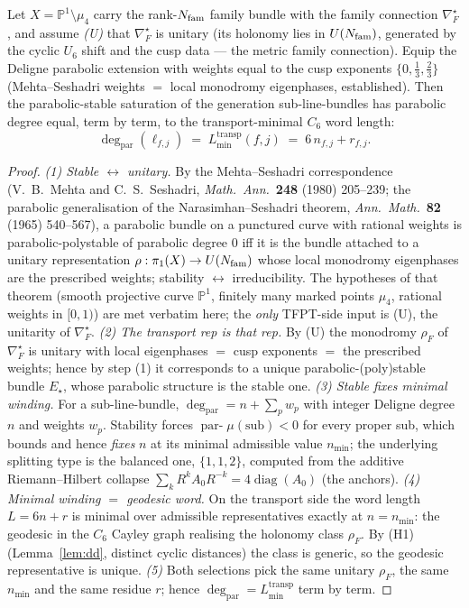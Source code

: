 \begin{theorem}[Stable $=$ minimal, via Mehta--Seshadri --- closes the flavor block]
\label{thm:ms}
Let $X=\mathbb P^1\setminus\mu_4$ carry the rank-$N_{\mathrm{fam}}$ family bundle with the family
connection $\nabla_F^\star$, and assume \emph{(U)} that $\nabla_F^\star$ is unitary (its holonomy lies in
$U(N_{\mathrm{fam}})$, generated by the cyclic $U_6$ shift and the cusp data --- the metric family connection).
Equip the Deligne parabolic extension with weights equal to the cusp exponents
$\{0,\tfrac13,\tfrac23\}$ (Mehta--Seshadri weights $=$ local monodromy eigenphases, established).
Then the parabolic-stable saturation of the generation sub-line-bundles has parabolic degree equal,
term by term, to the transport-minimal $C_6$ word length:
\[
  \deg_{\mathrm{par}}(\ell_{f,j}) \;=\; L^{\mathrm{transp}}_{\min}(f,j)\;=\;6\,n_{f,j}+r_{f,j}.
\]
\end{theorem}
\begin{proof}
\emph{(1) Stable $\leftrightarrow$ unitary.} By the Mehta--Seshadri correspondence (V.~B.~Mehta and
C.~S.~Seshadri, \emph{Math.\ Ann.}\ \textbf{248} (1980) 205--239; the parabolic generalisation of the
Narasimhan--Seshadri theorem, \emph{Ann.\ Math.}\ \textbf{82} (1965) 540--567), a parabolic bundle on
a punctured curve with rational weights is parabolic-polystable of parabolic degree $0$ iff it is the
bundle attached to a unitary representation $\rho:\pi_1(X)\to U(N_{\mathrm{fam}})$ whose local monodromy eigenphases
are the prescribed weights; stability $\leftrightarrow$ irreducibility. The hypotheses of that theorem
(smooth projective curve $\mathbb P^1$, finitely many marked points $\mu_4$, rational weights in $[0,1)$)
are met verbatim here; the \emph{only} TFPT-side input is (U), the unitarity of $\nabla_F^\star$.
\emph{(2) The transport rep is that rep.} By (U) the monodromy $\rho_F$ of $\nabla_F^\star$ is unitary
with local eigenphases $=$ cusp exponents $=$ the prescribed weights; hence by step (1) it corresponds to
a unique parabolic-(poly)stable bundle $E_\star$, whose parabolic structure is the stable one.
\emph{(3) Stable fixes minimal winding.} For a sub-line-bundle, $\deg_{\mathrm{par}}=n+\sum_p w_p$ with
integer Deligne degree $n$ and weights $w_p$. Stability forces $\operatorname{par-}\mu(\mathrm{sub})<0$
for every proper sub, which bounds and hence \emph{fixes} $n$ at its minimal admissible value $n_{\min}$;
the underlying splitting type is the balanced one, $\{1,1,2\}$, computed from the additive
Riemann--Hilbert collapse $\sum_k R^kA_0R^{-k}=4\operatorname{diag}(A_0)$ (the anchors).
\emph{(4) Minimal winding $=$ geodesic word.} On the transport side the word length $L=6n+r$ is minimal
over admissible representatives exactly at $n=n_{\min}$: the geodesic in the $C_6$ Cayley graph realising
the holonomy class $\rho_F$. By (H1) (Lemma~\ref{lem:dd}, distinct cyclic distances) the class is generic,
so the geodesic representative is unique.
\emph{(5)} Both selections pick the same unitary $\rho_F$, the same $n_{\min}$ and the same residue $r$;
hence $\deg_{\mathrm{par}}=L^{\mathrm{transp}}_{\min}$ term by term. \qedhere
\end{proof}

